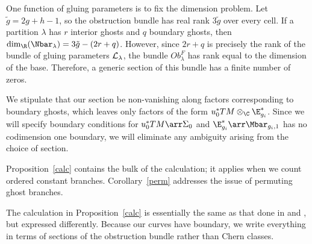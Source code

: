 \begin{remark} \label{dimFinZeros}
One function of gluing parameters is to fix the dimension problem. Let $\tilde{g}=2g+h-1$, so the obstruction bundle has real rank $3\tilde{g}$ over every cell. If a partition $\lambda$ has $r$ interior ghosts and $q$ boundary ghosts, then $\dim_\R(\Nbar_\lambda)=3\tilde{g}-(2r+q)$. However, since $2r+q$ is precisely the rank of the bundle of gluing parameters $\mathcal{L}_\lambda$, the bundle $Ob_\lambda^F$ has rank equal to the dimension of the base. Therefore, a generic section of this bundle has a finite number of zeros.

We stipulate that our section be non-vanishing along factors corresponding to boundary ghosts, which leaves only factors of the form $u_0^*TM \otimes_\C \E_{g_i}^*$. Since we will specify boundary conditions for $u_0^*TM \arr \Sigma_0$ and $\E_{g_i}^* \arr \Mbar_{g_i,1}$ has no codimension one boundary, we will eliminate any ambiguity arising from the choice of section.
\end{remark}

Proposition~\ref{calc} contains the bulk of the calculation; it applies when we count ordered constant branches. Corollary~\ref{perm} addresses the issue of permuting ghost branches.

\begin{remark}
The calculation in Proposition~\ref{calc} is essentially the same as that done in \cite{pand} and \cite{niuZinger}, but expressed differently. Because our curves have boundary, we write everything in terms of sections of the obstruction bundle rather than Chern classes. 
\end{remark}

